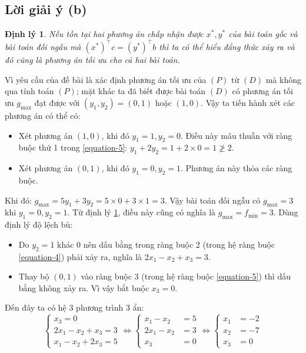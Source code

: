 \documentclass[12pt]{article}
\newtheorem{theorem}{Định lý}
\begin{document}
\subsection{Lời giải ý (b)}
\begin{theorem}\label{strong-theorem}
Nếu tồn tại hai phương án chấp nhận được $x^*, y^*$ của bài toán gốc và bài toán đối ngẫu mà $(x^*)^{\intercal}c = (y^*)^{\intercal}b$ thì ta có thể hiểu đẳng thức xảy ra và đó cũng là phương án tối ưu cho cả hai bài toán.\cite{lplu-2021}
\end{theorem}
\noindent Vì yêu cầu của đề bài là xác định phương án tối ưu của $(P)$ từ $(D)$ mà không qua tính toán $(P)$; mặt khác ta đã biết được bài toán $(D)$ có phương án tối ưu $g_{\max}$ đạt được với $(y_1, y_2) = (0, 1)$ hoặc $(1, 0)$. Vậy ta tiến hành xét các phương  án có thể có:
\begin{itemize}
\item Xét phương án $(1, 0)$, khi đó $y_1 = 1, y_2 = 0$. Điều này mâu thuẫn với ràng buộc thứ 1 trong \ref{equation-5}: $y_1 + 2y_2 = 1 + 2\times 0 = 1 \ngeq 2$.
\item Xét phương án $(0, 1)$, khi đó $y_1 = 0, y_2 = 1$. Phương án này thỏa các ràng buộc.
\end{itemize}
Khi đó: $g_{\max} = 5y_1 + 3y_2 = 5 \times 0 + 3 \times 1 = 3$. Vậy bài toán đối ngẫu có $g_{\max} = 3$ khi $y_1 = 0, y_2 = 1$. Từ định lý \ref{strong-theorem}, điều này cũng có nghĩa là $g_{\max} = f_{\min} = 3$. Dùng định lý độ lệch bù:
\begin{itemize}
\item Do $y_2 = 1$ khác 0 nên dấu bằng trong ràng buộc 2 (trong hệ ràng buộc \ref{equation-4}) phải xảy ra, nghĩa là $2x_1 - x_2 + x_3 = 3$.
\item Thay bộ $(0, 1)$ vào ràng buộc 3 (trong hệ ràng buộc \ref{equation-5}) thì dấu bằng không xảy ra. Vì vậy bắt buộc $x_3 = 0$.

\end{itemize}
Đến đây ta có hệ 3 phương trình 3 ẩn:
\begin{equation}
\left\{ 
\begin{aligned}
x_3 = 0 \\
2x_1 - x_2 + x_3 = 3 \\
x_1 - x_2 + 2x_3 = 5
\end{aligned}
\right.
\iff 
\left\{ 
\begin{aligned}
x_1 - x_2 &= 5 \\
2x_1 - x_2 &= 3 \\
x_3 &= 0
\end{aligned}
\right.
\iff
\left\{ 
\begin{aligned}
x_1 &= -2 \\
x_2 &= -7 \\
x_3 &= 0
\end{aligned}
\right.
\end{equation}
\end{document}
